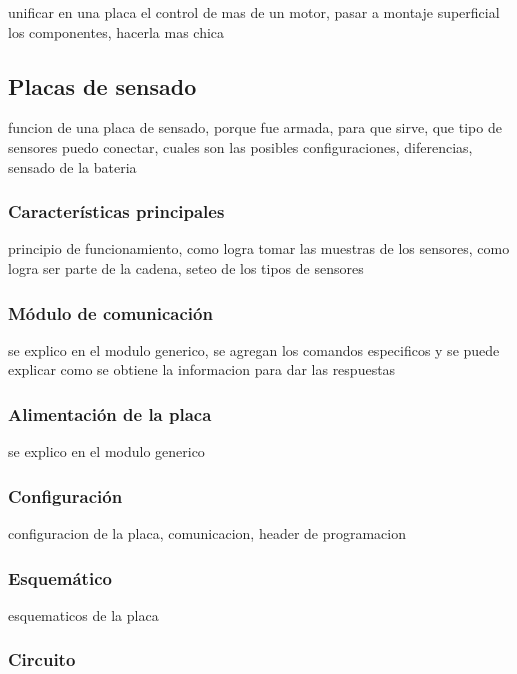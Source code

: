 unificar en una placa el control de mas de un motor, pasar a montaje superficial los componentes, hacerla mas chica

\subsection{Placas de sensado}
\label{}

funcion de una placa de sensado, porque fue armada, para que sirve, que tipo de sensores puedo conectar, cuales son las posibles configuraciones, diferencias, sensado de la bateria

\subsubsection{Caracter\'isticas principales}
\label{}

principio de funcionamiento, como logra tomar las muestras de los sensores, como logra ser parte de la cadena, seteo de los tipos de sensores

\subsubsection{M\'odulo de comunicaci\'on}
\label{}

se explico en el modulo generico, se agregan los comandos especificos y se puede explicar como se obtiene la informacion para dar las respuestas

\subsubsection{Alimentaci\'on de la placa}
\label{}

se explico en el modulo generico

\subsubsection{Configuraci\'on}
\label{}

configuracion de la placa, comunicacion, header de programacion

\subsubsection{Esquem\'atico}
\label{}

esquematicos de la placa

\subsubsection{Circuito}
\label{}

